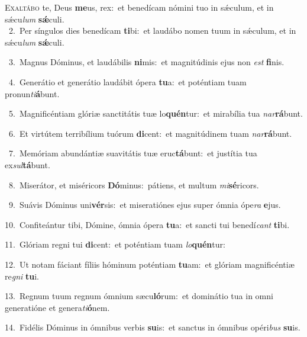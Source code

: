 \lettrine{\initial\textcolor{\initialcolor}{E}}{xaltábo} te, Deus \textbf{me}\-us, rex:~\star et benedícam nómini tuo in sǽculum, et in sǽcu\textit{lum} \textbf{sǽ}\-culi.\\
{\numbfont\textcolor{\numbcolor}{~2.}}~Per síngulos dies benedícam \textbf{ti}\-bi:~\star et laudábo nomen tuum in sǽculum, et in sǽcu\textit{lum} \textbf{sǽ}\-culi.\par
{\numbfont\textcolor{\numbcolor}{~3.}}~Magnus Dóminus, et laudábilis \textbf{ni}\-mis:~\star et magnitúdinis ejus non \textit{est} \textbf{fi}\-nis.\par
{\numbfont\textcolor{\numbcolor}{~4.}}~Generátio et generátio laudábit ópera \textbf{tu}\-a:~\star et poténtiam tuam pronun\-\textit{ti}\-\textbf{á}bunt.\par
{\numbfont\textcolor{\numbcolor}{~5.}}~Magnificéntiam glóriæ sanctitátis tuæ lo\-\textbf{quén}\-tur:~\star et mirabília tua \textit{nar}\-\textbf{rá}bunt.\par
{\numbfont\textcolor{\numbcolor}{~6.}}~Et virtútem terribílium tuórum \textbf{di}\-cent:~\star et magnitúdinem tuam \textit{nar}\-\textbf{rá}bunt.\par
{\numbfont\textcolor{\numbcolor}{~7.}}~Memóriam abundántiæ suavitátis tuæ eruc\-\textbf{tá}\-bunt:~\star et justítia tua ex\-\textit{sul}\-\textbf{tá}bunt.\par
{\numbfont\textcolor{\numbcolor}{~8.}}~Miserátor, et miséricors \textbf{Dó}\-minus:~\star pátiens, et multum \textit{mi}\-\textbf{sé}ricors.\par
{\numbfont\textcolor{\numbcolor}{~9.}}~Suávis Dóminus uni\-\textbf{vér}\-sis:~\star et miseratiónes ejus super ómnia ópe\textit{ra} \textbf{e}\-jus.\par
{\numbfont\textcolor{\numbcolor}{10.}}~Confiteántur tibi, Dómine, ómnia ópera \textbf{tu}\-a:~\star et sancti tui benedí\textit{cant} \textbf{ti}\-bi.\par
{\numbfont\textcolor{\numbcolor}{11.}}~Glóriam regni tui \textbf{di}\-cent:~\star et poténtiam tuam \textit{lo}\-\textbf{quén}tur:\par
{\numbfont\textcolor{\numbcolor}{12.}}~Ut notam fáciant fíliis hóminum poténtiam \textbf{tu}\-am:~\star et glóriam magnificéntiæ re\textit{gni} \textbf{tu}\-i.\par
{\numbfont\textcolor{\numbcolor}{13.}}~Regnum tuum regnum ómnium sæcu\-\textbf{ló}\-rum:~\star et dominátio tua in omni generatióne et genera\-\textit{ti}\-\textbf{ó}nem.\par
{\numbfont\textcolor{\numbcolor}{14.}}~Fidélis Dóminus in ómnibus verbis \textbf{su}\-is:~\star et sanctus in ómnibus opéri\textit{bus} \textbf{su}\-is.\par
